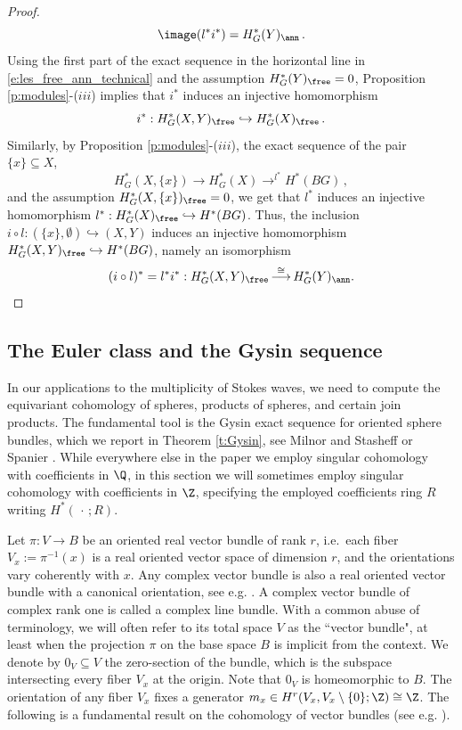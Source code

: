 \documentclass[11pt,a4paper,reqno]{article}
\DeclareMathOperator*{\toup}{\longrightarrow}
\numberwithin{equation}{section}
\theoremstyle{definition}
\begin{document}
\begin{proof}
\begin{equation}
\image(l^*i^*)= H^*_G(Y)_\ann \, .
\end{equation}
Using 
the  first part of the 
 exact sequence in the horizontal line in  \eqref{e:les_free_ann_technical}
 and the assumption  $H_G^*(Y)_\free =0$, Proposition 
\ref{p:modules}-($iii$) implies that $i^*$ induces an injective homomorphism
$$ i^*:H_G^*(X,Y)_\free\hookrightarrow H_G^*(X)_\free \, . 
$$
Similarly, by Proposition 
\ref{p:modules}-($iii$), 
the exact sequence of the pair $\{x\}\subseteq X$, 
$$ H_G^*(X,\{x\})\toup H_G^*(X)\toup^{l^*} H^*(BG) \, ,  
$$
and the assumption 
$ H_G^*(X,\{x\})_\free=0$,
we get  that $l^*$ induces an injective homomorphism 
$ l^*: H_G^*(X)_\free\hookrightarrow H^*(BG) $. 
Thus, the inclusion $i\circ l:(\{x\},\emptyset)\hookrightarrow(X,Y)$ induces 
an injective homomorphism $H^*_G(X,Y)_\free\hookrightarrow H^*(BG)$,  
namely an
isomorphism  
\[(i\circ l)^*=l^*i^*: H_G^*(X,Y)_\free \toup^{\cong} H^*_G(Y)_\ann.
\qedhere\]
\end{proof}

\subsection{The Euler class and the Gysin sequence}

In our applications to the multiplicity of Stokes waves, we  need to compute the equivariant cohomology of spheres, products of spheres, and certain join products. The fundamental tool is the Gysin exact sequence for oriented sphere bundles, which we report in 
Theorem \ref{t:Gysin}, see  Milnor and Stasheff \cite{Milnor:1974aa} or Spanier \cite{Spanier}.
While everywhere else in the paper we employ singular cohomology with coefficients in $\Q$, in this section we will sometimes employ singular cohomology with coefficients in $\Z$, specifying the employed coefficients ring $R$ writing $H^*(\,\cdot\,;R)$.


Let $\pi:V\to B$ be an oriented real vector bundle of rank $r$,   i.e.\  each  fiber $ V_x:=\pi^{-1}(x) $ is 
a real oriented vector space of  dimension $ r $, and the orientations vary coherently with $x$. Any complex vector bundle is also a real oriented vector bundle with a canonical orientation, see e.g. \cite[Lemma 14.1]{Milnor:1974aa}.
A complex vector bundle of complex rank one is called a complex line bundle. With a common abuse of terminology, we will often refer to its total space $V$ as the ``vector bundle", at least when the projection $\pi$ on the base space $ B $ is implicit from the context. We denote by $0_V\subseteq V$ the zero-section of the bundle, which is the subspace intersecting every fiber $V_x$ at the origin.
Note that $0_V$ is homeomorphic to $B$.
The orientation of any fiber $V_x$ fixes a generator $m_x\in H^r(V_x,V_x\setminus\{0\};\Z)\cong\Z$.
The following is a fundamental result on the cohomology of vector bundles (see e.g. \cite[Theorem 9.1]{Milnor:1974aa}).
\end{document}
